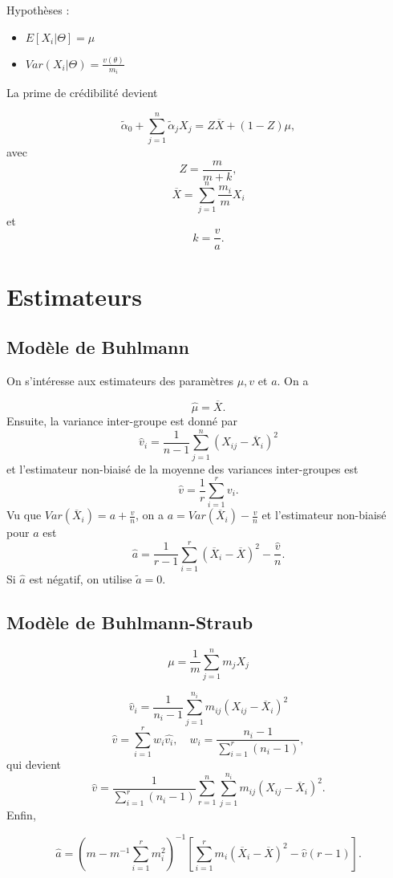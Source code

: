 Hypothèses : 

\begin{itemize}
	\item $E[X_i \vert \Theta] = \mu$
	\item $Var(X_i \vert \Theta) = \frac{v(\theta)}{m_i}$
\end{itemize}

La prime de crédibilité devient

$$\tilde{\alpha}_0 + \sum_{j = 1}^{n}\tilde{\alpha}_jX_j = Z\overline{X} + (1-Z)\mu,$$
avec
$$Z = \frac{m}{m + k},$$
$$\overline{X} = \sum_{j = 1}^{n}\frac{m_i}{m} X_i$$
et
$$k = \frac{v}{a}.$$

\section{Estimateurs}

\subsection{Modèle de Buhlmann}

On s'intéresse aux estimateurs des paramètres $\mu, v$ et $a$. On a 

$$\hat{\mu} = \overline{X}.$$
Ensuite, la variance inter-groupe est donné par
$$\hat{v}_i = \frac{1}{n-1} \sum_{j = 1}^{n} (X_{ij} - \overline{X}_i)^2$$
et l'estimateur non-biaisé de la moyenne des variances inter-groupes est
$$\hat{v} = \frac{1}{r} \sum_{i = 1}^{r} v_i.$$
Vu que $Var(\overline{X}_i) = a + \frac{v}{n}$, on a $a = Var(\overline{X}_i) - \frac{v}{n}$ et l'estimateur non-biaisé pour $a$ est
$$\hat{a} = \frac{1}{r-1}  \sum_{i = 1}^{r} (\overline{X}_i - \overline{X})^2 - \frac{\hat{v}}{n}.$$
Si $\hat{a}$ est négatif, on utilise $\tilde{a} = 0$. 

\subsection{Modèle de Buhlmann-Straub}

$$\mu = \frac{1}{m} \sum_{j = 1}^{n} m_j X_j$$

$$\hat{v}_i = \frac{1}{n_i - 1}\sum_{j = 1}^{n_i} m_{ij}(X_{ij} - \overline{X}_i)^2$$
$$\hat{v} = \sum_{i = 1}^{r} w_i \hat{v_i}, \quad w_i = \frac{n_i - 1}{\sum_{i = 1}^{r} (n_i - 1)},$$
qui devient
$$\hat{v} = \frac{1}{\sum_{i = 1}^{r} (n_i - 1)} \sum_{r = 1}^{n} \sum_{j = 1}^{n_i} m_{ij} \left(X_{ij} - \overline{X}_i\right)^2.$$
Enfin, 

$$\hat{a} = \left(m - m^{-1} \sum_{i = 1}^{r}m_i^2\right)^{-1}\left[\sum_{i = 1}^{r} m_i \left(\overline{X}_i - \overline{X}\right)^2 - \hat{v} (r-1)\right].$$





